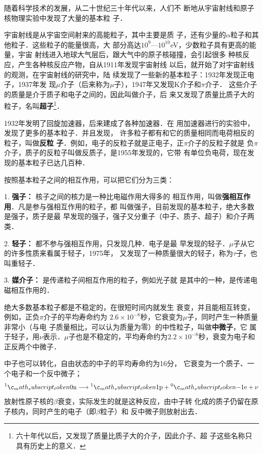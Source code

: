 随着科学技术的发展，从二十世纪三十年代以来，人们不
断地从宇宙射线和原子核物理实验中发现了大量的基本粒
子．

宇宙射线是从宇宙空间射来的高能粒子，其中主要是质
子，还有少量的$\alpha$粒子和其他粒子．这些粒子的能量很高，大
部分高达$10^9$—$10^{10}$eV，少数粒子具有更高的能量，宇宙
射线进入地球大气层后，跟大气中的原子核碰撞，会引起很多
种核反应，产生各种核反应产物，自从1911年发现宇宙射线
以后，就开始了对宇宙射线的观测，在宇宙射线的研究中，陆
续发现了一些新的基本粒子：1932年发现正电子，1937年发
现$\mu$介子（后来称为$\mu$子），1947年又发现K介子和$\pi$介子．
这些介子的质量是介于质子和电子之间的，因此叫做介子，后
来又发现了质量比质子大的粒子，名叫\textbf{超子}\footnote{六十年代以后，又发现了质量比质子大的介子，因此介子、超
子这些名称只具有历史上的意义．}．

1932年发明了回旋加速器，后来建成了各种加速器．在
用加速器进行的实验中，发现了更多的基本粒子．并且发现，
许多粒子都有和它的质量相同而电荷相反的粒子，叫做\textbf{反粒
子}．例如，电子的反粒子就是正电子，正$\pi$介子的反粒子就是
负$\pi$介子，质子的反粒子叫做反质子，是1955年发现的，它带
有单位负电荷，现在发现的基本粒子已达几百种．

按照基本粒子之间的相互作用，可以把它们分为三类：

1. \textbf{强子：} 核子之间的核力是一种比电磁作用大得多的
相互作用，叫做\textbf{强相互作用}．凡是参与强相互作用的粒子，都
叫做强子，目前发现的基本粒子，绝大多数是强子，质子是最
早发现的强子，强子又分重子（中子、质子、超子）和介子两类．

2. \textbf{轻子：} 都不参与强相互作用，只发现几种．电子是最
早发现的轻子．$\mu$子从它的许多性质来看属于轻子，1975年，
又发现了一种质量很大的轻子，称为$\tau$子，也叫重轻子．

3. \textbf{媒介子：} 是传递粒子间相互作用的粒子，例如光子就
是其中的一种，是传递电磁相互作用的．

绝大多数基本粒子都是不稳定的，在很短时间内就发生
衰变，并且能相互转变，例如，正负$\pi$介子的平均寿命约为
$2.6\times10^{-8}$秒，它衰变为$\mu$子，同时产生一种质量非常小（与电
子质量相比，可以认为质量为零）的中性粒子，叫做\textbf{中微子}，它
属于轻子，用$\nu$表示．$\mu$子也是不稳定的，平均寿命约为$2.2\times
10^{-8}$秒，衰变为电子和正反两个中微子．

中子也可以转化，自由状态的中子的平均寿命约为16分，
它衰变为一个质子、一个电子和一个反中微子；
\[\atom{n}{1}{0}\longrightarrow \atom{p}{1}{1}+\atom{e}{0}{-1}+\nu   \]
放射性原子核的$\beta$衰变，实际发生的就是这种反应，由中子转
化成的质子仍留在原子核内，同时产生的电子（即$\beta$粒子）和
反中微子则放射出去．

